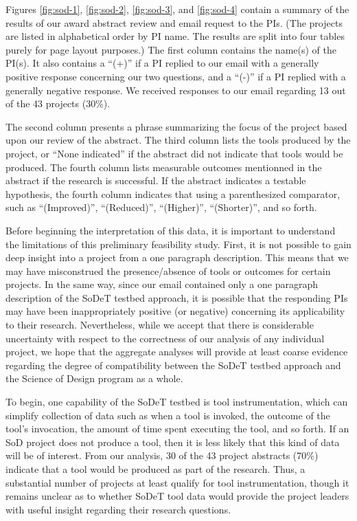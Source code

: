 Figures \ref{fig:sod-1}, \ref{fig:sod-2}, \ref{fig:sod-3}, and
\ref{fig:sod-4} contain a summary of the results of our award abstract
review and email request to the PIs. (The projects are listed in
alphabetical order by PI name. The results are split into four tables
purely for page layout purposes.)  The first column contains the name(s) of
the PI(s).  It also contains a ``(+)'' if a PI replied to our email with a
generally positive response concerning our two questions, and a ``(-)'' if
a PI replied with a generally negative response.  We received responses
to our email regarding 13 out of the 43 projects (30\%).

The second column presents a phrase summarizing the focus of the project
based upon our review of the abstract.  The third column lists the tools
produced by the project, or ``None indicated'' if the abstract did not
indicate that tools would be produced.  The fourth column lists measurable
outcomes mentionned in the abstract if the research is successful.  If the
abstract indicates a testable hypothesis, the fourth column indicates that
using a parenthesized comparator, such as ``(Improved)'', ``(Reduced)'',
``(Higher)'', ``(Shorter)'', and so forth.

Before beginning the interpretation of this data, it is important to
understand the limitations of this preliminary feasibility study.
First, it is not possible to gain deep insight into a project from a one
paragraph description.  This means that we may have misconstrued the
presence/absence of tools or outcomes for certain projects.  In the same
way, since our email contained only a one paragraph description of the
SoDeT testbed approach, it is possible that the responding PIs may have
been inappropriately positive (or negative) concerning its applicability to
their research.  Nevertheless, while we accept that there is considerable
uncertainty with respect to the correctness of our analysis of any
individual project, we hope that the aggregate analyses will provide at
least coarse evidence regarding the degree of compatibility between the
SoDeT testbed approach and the Science of Design program as a whole.

To begin, one capability of the SoDeT testbed is tool instrumentation,
which can simplify collection of data such as when a tool is invoked, the
outcome of the tool's invocation, the amount of time spent executing the
tool, and so forth.  If an SoD project does not produce a tool, then it is
less likely that this kind of data will be of interest.  From our analysis,
30 of the 43 project abstracts (70\%) indicate that a tool would be
produced as part of the research.  Thus, a substantial number of projects
at least qualify for tool instrumentation, though it remains unclear as to
whether SoDeT tool data would provide the project leaders with useful
insight regarding their research questions.

